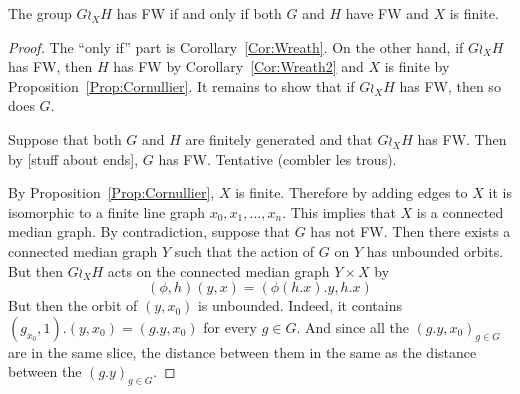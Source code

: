 \begin{thm}[L-S]
The group $G\wr_X H$ has FW if and only if both $G$ and $H$ have FW and $X$ is finite.
\end{thm}
\begin{proof}
The ``only if'' part is Corollary~\ref{Cor:Wreath}.
On the other hand, if $G\wr_X H$ has FW, then $H$ has FW by Corollary~\ref{Cor:Wreath2} and $X$ is finite by Proposition~\ref{Prop:Cornullier}.
It remains to show that if $G\wr_X H$ has FW, then so does $G$.

Suppose that both $G$ and $H$ are finitely generated and that $G\wr_X H$ has FW. Then by [stuff about ends], $G$ has FW.
Tentative (combler les trous).

By Proposition~\ref{Prop:Cornullier}, $X$ is finite. Therefore by adding edges to $X$ it is isomorphic to a finite line graph $x_0,x_1,\dots, x_n$. This implies that $X$ is a connected median graph.
By contradiction, suppose that $G$ has not FW.
Then there exists a connected median graph $Y$ such that the action of $G$ on $Y$ has unbounded orbits.
But then $G\wr_X H$ acts on the connected median graph $Y\times X$ by
\[
	(\phi,h)(y,x) = (\phi(h.x).y, h.x)
\]
But then the orbit of $(y,x_0)$ is unbounded.
Indeed, it contains $(g_{x_0},1).(y,x_0)=(g.y,x_0)$ for every $g\in G$. And since all the $(g.y,x_0)_{g\in G}$ are in the same slice, the distance between them in the same as the distance between the $(g.y)_{g\in G}$.

\end{proof}